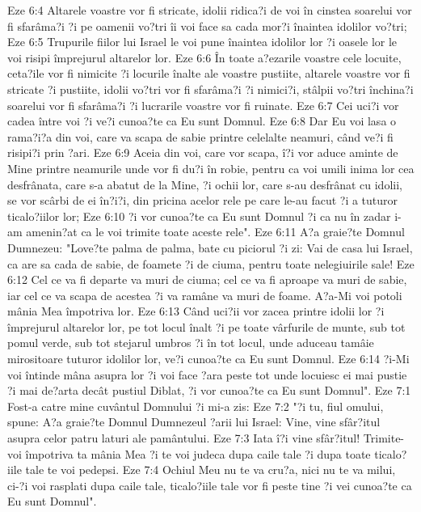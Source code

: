 Eze 6:4  Altarele voastre vor fi stricate, idolii ridica?i de voi în cinstea soarelui vor fi sfarâma?i ?i pe oamenii vo?tri îi voi face sa cada mor?i înaintea idolilor vo?tri;
Eze 6:5  Trupurile fiilor lui Israel le voi pune înaintea idolilor lor ?i oasele lor le voi risipi împrejurul altarelor lor.
Eze 6:6  În toate a?ezarile voastre cele locuite, ceta?ile vor fi nimicite ?i locurile înalte ale voastre pustiite, altarele voastre vor fi stricate ?i pustiite, idolii vo?tri vor fi sfarâma?i ?i nimici?i, stâlpii vo?tri închina?i soarelui vor fi sfarâma?i ?i lucrarile voastre vor fi ruinate.
Eze 6:7  Cei uci?i vor cadea între voi ?i ve?i cunoa?te ca Eu sunt Domnul.
Eze 6:8  Dar Eu voi lasa o rama?i?a din voi, care va scapa de sabie printre celelalte neamuri, când ve?i fi risipi?i prin ?ari.
Eze 6:9  Aceia din voi, care vor scapa, î?i vor aduce aminte de Mine printre neamurile unde vor fi du?i în robie, pentru ca voi umili inima lor cea desfrânata, care s-a abatut de la Mine, ?i ochii lor, care s-au desfrânat cu idolii, se vor scârbi de ei în?i?i, din pricina acelor rele pe care le-au facut ?i a tuturor ticalo?iilor lor;
Eze 6:10  ?i vor cunoa?te ca Eu sunt Domnul ?i ca nu în zadar i-am amenin?at ca le voi trimite toate aceste rele".
Eze 6:11  A?a graie?te Domnul Dumnezeu: "Love?te palma de palma, bate cu piciorul ?i zi: Vai de casa lui Israel, ca are sa cada de sabie, de foamete ?i de ciuma, pentru toate nelegiuirile sale!
Eze 6:12  Cel ce va fi departe va muri de ciuma; cel ce va fi aproape va muri de sabie, iar cel ce va scapa de acestea ?i va ramâne va muri de foame. A?a-Mi voi potoli mânia Mea împotriva lor.
Eze 6:13  Când uci?ii vor zacea printre idolii lor ?i împrejurul altarelor lor, pe tot locul înalt ?i pe toate vârfurile de munte, sub tot pomul verde, sub tot stejarul umbros ?i în tot locul, unde aduceau tamâie mirositoare tuturor idolilor lor, ve?i cunoa?te ca Eu sunt Domnul.
Eze 6:14  ?i-Mi voi întinde mâna asupra lor ?i voi face ?ara peste tot unde locuiesc ei mai pustie ?i mai de?arta decât pustiul Diblat, ?i vor cunoa?te ca Eu sunt Domnul".
Eze 7:1  Fost-a catre mine cuvântul Domnului ?i mi-a zis:
Eze 7:2  "?i tu, fiul omului, spune: A?a graie?te Domnul Dumnezeul ?arii lui Israel: Vine, vine sfâr?itul asupra celor patru laturi ale pamântului.
Eze 7:3  Iata î?i vine sfâr?itul! Trimite-voi împotriva ta mânia Mea ?i te voi judeca dupa caile tale ?i dupa toate ticalo?iile tale te voi pedepsi.
Eze 7:4  Ochiul Meu nu te va cru?a, nici nu te va milui, ci-?i voi rasplati dupa caile tale, ticalo?iile tale vor fi peste tine ?i vei cunoa?te ca Eu sunt Domnul".
